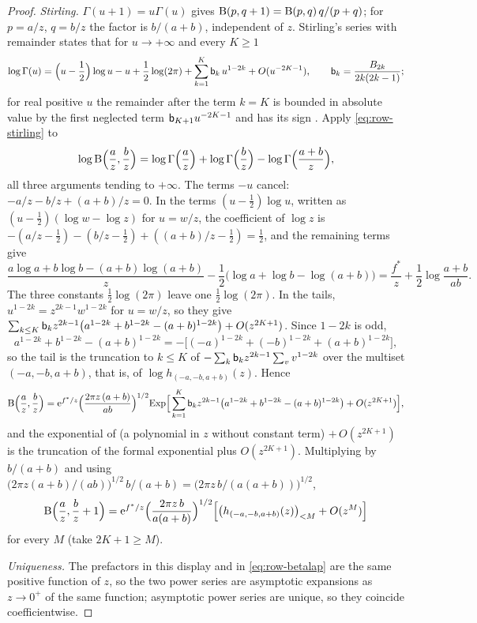 \begin{proof}
\emph{Stirling.} $\Gamma(u+1)=u\Gamma(u)$ gives $\mathrm{B}(p,q+1)=\mathrm{B}(p,q)\,q/(p+q)$; for $p=a/z$, $q=b/z$ the factor is $b/(a+b)$, independent of $z$. Stirling's series with remainder \cite[5.11.1]{DLMF} states that for $u\to+\infty$ and every $K\geq1$
\begin{equation}
\label{eq:row-stirling}
\log\Gamma(u)=\Big(u-\frac12\Big)\log u-u+\frac12\log(2\pi)+\sum_{k=1}^{K}\mathsf{b}_k\,u^{1-2k}+O(u^{-2K-1}),\qquad \mathsf{b}_k=\frac{B_{2k}}{2k(2k-1)};
\end{equation}
for real positive $u$ the remainder after the term $k=K$ is bounded in absolute value by the first neglected term $\mathsf{b}_{K+1}u^{-2K-1}$ and has its sign \cite[Section~5.11(ii)]{DLMF}. Apply \eqref{eq:row-stirling} to
\[
\log\mathrm{B}\Big(\frac az,\frac bz\Big)=\log\Gamma\Big(\frac az\Big)+\log\Gamma\Big(\frac bz\Big)-\log\Gamma\Big(\frac{a+b}z\Big),
\]
all three arguments tending to $+\infty$. The terms $-u$ cancel: $-a/z-b/z+(a+b)/z=0$. In the terms $(u-\frac12)\log u$, written as $(u-\frac12)(\log w-\log z)$ for $u=w/z$, the coefficient of $\log z$ is $-(a/z-\frac12)-(b/z-\frac12)+((a+b)/z-\frac12)=\frac12$, and the remaining terms give
\[
\frac{a\log a+b\log b-(a+b)\log(a+b)}{z}-\frac12\big(\log a+\log b-\log(a+b)\big)=\frac{f^\ast}{z}+\frac12\log\frac{a+b}{ab}.
\]
The three constants $\frac12\log(2\pi)$ leave one $\frac12\log(2\pi)$. In the tails, $u^{1-2k}=z^{2k-1}w^{1-2k}$ for $u=w/z$, so they give $\sum_{k\leq K}\mathsf{b}_kz^{2k-1}\big(a^{1-2k}+b^{1-2k}-(a+b)^{1-2k}\big)+O(z^{2K+1})$. Since $1-2k$ is odd,
\[
a^{1-2k}+b^{1-2k}-(a+b)^{1-2k}=-\big[(-a)^{1-2k}+(-b)^{1-2k}+(a+b)^{1-2k}\big],
\]
so the tail is the truncation to $k\leq K$ of $-\sum_k\mathsf{b}_kz^{2k-1}\sum_vv^{1-2k}$ over the multiset $(-a,-b,a+b)$, that is, of $\log h_{(-a,-b,a+b)}(z)$. Hence
\[
\mathrm{B}\Big(\frac az,\frac bz\Big)=\mathrm{e}^{f^\ast/z}\Big(\frac{2\pi z\,(a+b)}{ab}\Big)^{1/2}\mathrm{Exp}\Big[\sum_{k=1}^{K}\mathsf{b}_kz^{2k-1}\big(a^{1-2k}+b^{1-2k}-(a+b)^{1-2k}\big)+O(z^{2K+1})\Big],
\]
and the exponential of (a polynomial in $z$ without constant term) $+\,O(z^{2K+1})$ is the truncation of the formal exponential plus $O(z^{2K+1})$. Multiplying by $b/(a+b)$ and using $\big(2\pi z(a+b)/(ab)\big)^{1/2}\,b/(a+b)=\big(2\pi z\,b/(a(a+b))\big)^{1/2}$,
\[
\mathrm{B}\Big(\frac az,\frac bz+1\Big)=\mathrm{e}^{f^\ast/z}\Big(\frac{2\pi z\,b}{a(a+b)}\Big)^{1/2}\Big[\big(h_{(-a,-b,a+b)}(z)\big)_{<M}+O(z^M)\Big]
\]
for every $M$ (take $2K+1\geq M$).

\emph{Uniqueness.} The prefactors in this display and in \eqref{eq:row-betalap} are the same positive function of $z$, so the two power series are asymptotic expansions as $z\to0^+$ of the same function; asymptotic power series are unique, so they coincide coefficientwise.
\end{proof}

